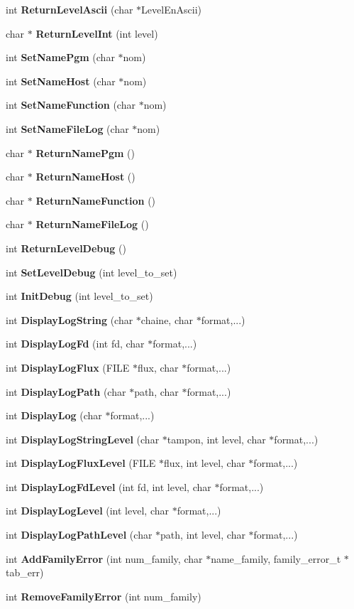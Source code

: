 \begin{CompactItemize}
\item 
int {\bf ReturnLevelAscii} (char $\ast$LevelEnAscii)
\item 
char $\ast$ {\bf ReturnLevelInt} (int level)
\item 
int {\bf SetNamePgm} (char $\ast$nom)
\item 
int {\bf SetNameHost} (char $\ast$nom)
\item 
int {\bf SetNameFunction} (char $\ast$nom)
\item 
int {\bf SetNameFileLog} (char $\ast$nom)
\item 
char $\ast$ {\bf ReturnNamePgm} ()
\item 
char $\ast$ {\bf ReturnNameHost} ()
\item 
char $\ast$ {\bf ReturnNameFunction} ()
\item 
char $\ast$ {\bf ReturnNameFileLog} ()
\item 
int {\bf ReturnLevelDebug} ()
\item 
int {\bf SetLevelDebug} (int level\_\-to\_\-set)
\item 
int {\bf InitDebug} (int level\_\-to\_\-set)
\item 
int {\bf DisplayLogString} (char $\ast$chaine, char $\ast$format,...)
\item 
int {\bf DisplayLogFd} (int fd, char $\ast$format,...)
\item 
int {\bf DisplayLogFlux} (FILE $\ast$flux, char $\ast$format,...)
\item 
int {\bf DisplayLogPath} (char $\ast$path, char $\ast$format,...)
\item 
int {\bf DisplayLog} (char $\ast$format,...)
\item 
int {\bf DisplayLogStringLevel} (char $\ast$tampon, int level, char $\ast$format,...)
\item 
int {\bf DisplayLogFluxLevel} (FILE $\ast$flux, int level, char $\ast$format,...)
\item 
int {\bf DisplayLogFdLevel} (int fd, int level, char $\ast$format,...)
\item 
int {\bf DisplayLogLevel} (int level, char $\ast$format,...)
\item 
int {\bf DisplayLogPathLevel} (char $\ast$path, int level, char $\ast$format,...)
\item 
int {\bf AddFamilyError} (int num\_\-family, char $\ast$name\_\-family, family\_\-error\_\-t $\ast$tab\_\-err)
\item 
int {\bf RemoveFamilyError} (int num\_\-family)

\end{CompactItemize}
